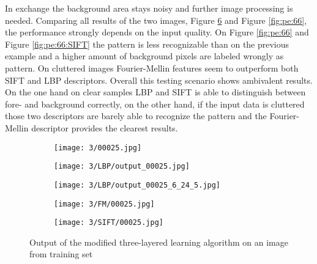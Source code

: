 \documentclass[draft,final]{vutinfth} %
\begin{document}
In exchange the background area stays noisy and further image processing is needed.
Comparing all results of the two images, Figure \ref{fig:pe:25} and Figure \ref{fig:pe:66}, the performance strongly depends on the input quality.
On Figure \ref{fig:pe:66} and Figure \ref{fig:pe:66:SIFT} the pattern is less recognizable than on the previous example and a higher amount of background pixels are labeled wrongly as pattern.
On cluttered images Fourier-Mellin features seem to outperform both SIFT and LBP descriptors.
Overall this testing scenario shows ambivalent results.
On the one hand on clear samples LBP and SIFT is able to distinguish between fore- and background correctly, on the other hand, if the input data is cluttered those two descriptors are barely able to recognize the pattern and the Fourier-Mellin descriptor provides the clearest results. 

\begin{figure}[h]
  \centering
  \begin{subfigure}[b]{0.19\columnwidth}
    \centering
    \texttt{[image: 3/00025.jpg]}
    \label{fig:pe:25:orig}
  \end{subfigure}
  \begin{subfigure}[b]{0.19\columnwidth}
    \centering
    \texttt{[image: 3/LBP/output\_00025.jpg]}
    \label{fig:pe:25:LBPs}
  \end{subfigure}
  \begin{subfigure}[b]{0.19\columnwidth}
    \centering
    \texttt{[image: 3/LBP/output\_00025\_6\_24\_5.jpg]}
    \label{fig:pe:25:LBPb}
  \end{subfigure}
  \begin{subfigure}[b]{0.19\columnwidth}
    \centering
    \texttt{[image: 3/FM/00025.jpg]}
    \label{fig:pe:25:FM}
  \end{subfigure}
  \begin{subfigure}[b]{0.19\columnwidth}
    \centering
    \texttt{[image: 3/SIFT/00025.jpg]}
    \label{fig:pe:25:SIFT}
  \end{subfigure}
  \caption{Output of the modified three-layered learning algorithm on an image from training set}
  \label{fig:pe:25}
\end{figure}
\end{document}
